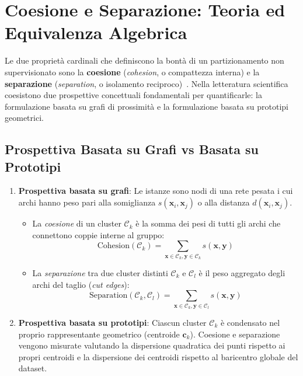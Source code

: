 \FloatBarrier
\section{Coesione e Separazione: Teoria ed Equivalenza Algebrica}
\label{sec:dm-cohesion-separation-theory}

Le due proprietà cardinali che definiscono la bontà di un partizionamento non supervisionato sono la \textbf{coesione} (\textit{cohesion}, o compattezza interna) e la \textbf{separazione} (\textit{separation}, o isolamento reciproco)~\cite{tan2018}. Nella letteratura scientifica coesistono due prospettive concettuali fondamentali per quantificarle: la formulazione basata su grafi di prossimità e la formulazione basata su prototipi geometrici.

\FloatBarrier
\subsection{Prospettiva Basata su Grafi vs Basata su Prototipi}
\begin{enumerate}
    \item \textbf{Prospettiva basata su grafi}: Le istanze sono nodi di una rete pesata i cui archi hanno peso pari alla somiglianza $s(\mathbf{x}_i, \mathbf{x}_j)$ o alla distanza $d(\mathbf{x}_i, \mathbf{x}_j)$.
    \begin{itemize}[noitemsep]
        \item La \textit{coesione} di un cluster $\mathcal{C}_k$ è la somma dei pesi di tutti gli archi che connettono coppie interne al gruppo:
        \begin{equation}
        \mathrm{Cohesion}(\mathcal{C}_k) = \sum_{\mathbf{x} \in \mathcal{C}_k, \mathbf{y} \in \mathcal{C}_k} s(\mathbf{x}, \mathbf{y})
        \end{equation}
        \item La \textit{separazione} tra due cluster distinti $\mathcal{C}_k$ e $\mathcal{C}_l$ è il peso aggregato degli archi del taglio (\textit{cut edges}):
        \begin{equation}
        \mathrm{Separation}(\mathcal{C}_k, \mathcal{C}_l) = \sum_{\mathbf{x} \in \mathcal{C}_k, \mathbf{y} \in \mathcal{C}_l} s(\mathbf{x}, \mathbf{y})
        \end{equation}
    \end{itemize}
    
    \item \textbf{Prospettiva basata su prototipi}: Ciascun cluster $\mathcal{C}_k$ è condensato nel proprio rappresentante geometrico (centroide $\mathbf{c}_k$). Coesione e separazione vengono misurate valutando la dispersione quadratica dei punti rispetto ai propri centroidi e la dispersione dei centroidi rispetto al baricentro globale del dataset.
\end{enumerate}

